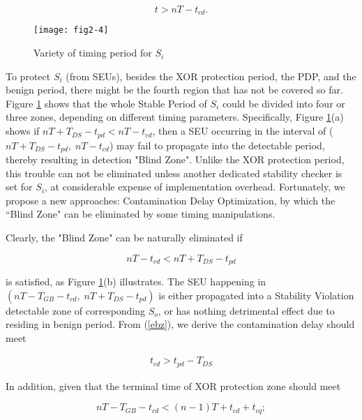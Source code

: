 \begin{equation}\label{benign}
t>nT-t_{cd}.
\end{equation}

\begin{figure}[ht]
\centering
\texttt{[image: fig2-4]}
  \caption{Variety of timing period for $S_i$}\label{zones}
\end{figure}

To protect $S_i$ (from SEUs), besides the XOR protection period, the PDP, and the benign period, there might be the fourth region that has not be covered so far. Figure \ref{zones} shows that the whole Stable Period of $S_i$ could be divided into four or three zones, depending on different timing parameters. Specifically, Figure \ref{zones}(a) shows if $nT+T_{DS}-t_{pd}<nT-t_{cd}$, then a SEU occurring in the interval of ($nT+T_{DS}-t_{pd},\;nT-t_{cd}$)  may fail to propagate into the detectable period, thereby resulting in detection "Blind Zone". Unlike the XOR protection period, this trouble can not be eliminated unless another dedicated stability checker is set for $S_i$, at considerable expense of implementation overhead. Fortunately, we propose a new approaches: Contamination Delay Optimization, by which the ``Blind Zone" can be eliminated by some timing manipulations.

 Clearly, the "Blind Zone" can be naturally
eliminated if

\begin{equation}\label{ebz}
nT-t_{cd} < nT+T_{DS}-t_{pd}
\end{equation}

is satisfied, as Figure \ref{zones}(b) illustrates. The SEU happening in $(nT-T_{GB}-t_{cd}, \; nT+T_{DS}-t_{pd})$ is either propagated into a Stability Violation detectable zone of corresponding $S_o$, or has nothing detrimental effect due to residing in benign period. From (\ref{ebz}), we derive the contamination delay should meet 

\begin{eqnarray}\label{eq80}
 t_{cd} > t_{pd} - T_{DS}
\end{eqnarray}

In addition, given that the terminal time of XOR protection zone should meet

\begin{equation}
  nT-T_{GB}-t_{cd} < (n-1)T + t_{cd} + t_{cq}; \nonumber
\end{equation}

